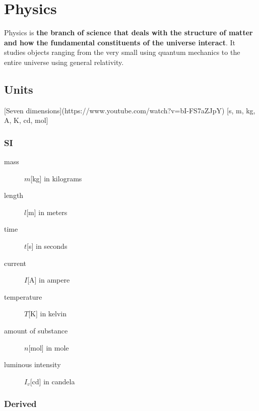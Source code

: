 \section{Physics}

Physics is \textbf{the branch of science that deals with the structure of matter and how the fundamental constituents of the universe interact}. 
It studies objects ranging from the very small using quantum mechanics to the entire universe using general relativity.
\subsection{Units}

[Seven dimensions](https://www.youtube.com/watch?v=bI-FS7aZJpY) [s, m, kg, A, K, cd, mol]

\subsubsection{SI}

\begin{description}
  \item[mass] $m$[kg] in kilograms
  \item[length] $l$[m] in meters
  \item[time] $t$[s] in seconds
  \item[current] $I$[A] in ampere
  \item[temperature] $T$[K] in kelvin
  \item[amount of substance] $n$[mol] in mole
  \item[luminous intensity] $I_v$[cd] in candela
\end{description}

\subsubsection{Derived}

\newcommand{\pow}[2]{\text{#1}^\text{#2}}
\renewcommand{\in}[1]{\left[#1\right]}


